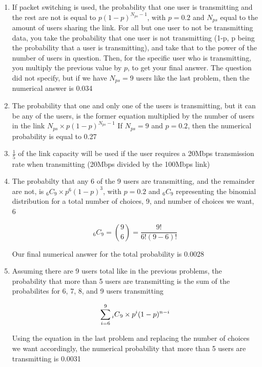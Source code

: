 \documentclass[14pt]{article}
\begin{document}
\begin{enumerate}
\begin{enumerate}[1.]
\item
If packet switching is used, the probability that one user is transmitting and the rest are not is equal to $p(1-p)^{N_{ps} - 1}$, with $p = 0.2$ and $N_{ps}$ equal to the amount of users sharing the link. For all but one user to not be transmitting data, you take the probability that one user is not transmitting (1-p, p being the probability that a user is transmitting), and take that to the power of the number of users in question. Then, for the specific user who is transmitting, you multiply the previous value by $p$, to get your final answer. The question did not specify, but if we have $N_{ps} = 9$ users like the last problem, then the numerical answer is 0.034

\item
The probability that one and only one of the users is transmitting, but it can be any of the users, is the former equation multiplied by the number of users in the link 
$N_{ps} \times p(1-p)^{N_{ps}-1}$
If $N_{ps} = 9$ and $p = 0.2$, then the numerical probability is equal to 0.27

\item
$\frac{1}{5}$ of the link capacity will be used if the user requires a 20Mbps transmission rate when transmitting (20Mbps divided by the 100Mbps link)

\item
The probabilty that any 6 of the 9 users are transmitting, and the remainder are not, is $_6C_9 \times p^6(1-p)^3$, with $p = 0.2$ and $_6C_9$ representing the binomial distribution for a total number of choices, 9, and number of choices we want, 6 

$$_6C_9 = \binom{9}{6} = \frac{9!}{6!(9-6)!}$$

Our final numerical answer for the total probability is 0.0028

\item
Assuming there are 9 users total like in the previous problems, the probability that more than 5 users are transmitting is the sum of the probabilites for 6, 7, 8, and 9 users transmitting

$$\sum_{i=6}^{9} \prescript{}{i}C_9 \times p^i(1-p)^{n-i}$$

Using the equation in the last problem and replacing the number of choices we want accordingly, the numerical probability that more than 5 users are transmitting is 0.0031


\end{enumerate}

\end{enumerate}
\end{document}
